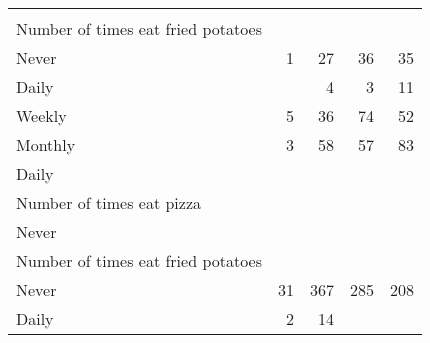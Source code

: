 \documentclass{article}
\begin{document}
\begin{tabular}{lllll}
  \multicolumn{1}{|r}{} &
  \multicolumn{1}{r}{} &
  \multicolumn{1}{r}{} &
  \multicolumn{1}{r}{} \\
\multicolumn{1}{l}{\hspace{4em}Number of times eat fried potatoes} &
  \multicolumn{1}{|r}{} &
  \multicolumn{1}{r}{} &
  \multicolumn{1}{r}{} &
  \multicolumn{1}{r}{} \\
\multicolumn{1}{l}{\hspace{5em}Never} &
  \multicolumn{1}{|r}{1} &
  \multicolumn{1}{r}{27} &
  \multicolumn{1}{r}{36} &
  \multicolumn{1}{r}{35} \\
\multicolumn{1}{l}{\hspace{5em}Daily} &
  \multicolumn{1}{|r}{} &
  \multicolumn{1}{r}{4} &
  \multicolumn{1}{r}{3} &
  \multicolumn{1}{r}{11} \\
\multicolumn{1}{l}{\hspace{5em}Weekly} &
  \multicolumn{1}{|r}{5} &
  \multicolumn{1}{r}{36} &
  \multicolumn{1}{r}{74} &
  \multicolumn{1}{r}{52} \\
\multicolumn{1}{l}{\hspace{5em}Monthly} &
  \multicolumn{1}{|r}{3} &
  \multicolumn{1}{r}{58} &
  \multicolumn{1}{r}{57} &
  \multicolumn{1}{r}{83} \\
\multicolumn{1}{l}{\hspace{1em}Daily} &
  \multicolumn{1}{|r}{} &
  \multicolumn{1}{r}{} &
  \multicolumn{1}{r}{} &
  \multicolumn{1}{r}{} \\
\multicolumn{1}{l}{\hspace{2em}Number of times eat pizza} &
  \multicolumn{1}{|r}{} &
  \multicolumn{1}{r}{} &
  \multicolumn{1}{r}{} &
  \multicolumn{1}{r}{} \\
\multicolumn{1}{l}{\hspace{3em}Never} &
  \multicolumn{1}{|r}{} &
  \multicolumn{1}{r}{} &
  \multicolumn{1}{r}{} &
  \multicolumn{1}{r}{} \\
\multicolumn{1}{l}{\hspace{4em}Number of times eat fried potatoes} &
  \multicolumn{1}{|r}{} &
  \multicolumn{1}{r}{} &
  \multicolumn{1}{r}{} &
  \multicolumn{1}{r}{} \\
\multicolumn{1}{l}{\hspace{5em}Never} &
  \multicolumn{1}{|r}{31} &
  \multicolumn{1}{r}{367} &
  \multicolumn{1}{r}{285} &
  \multicolumn{1}{r}{208} \\
\multicolumn{1}{l}{\hspace{5em}Daily} &
  \multicolumn{1}{|r}{2} &
  \multicolumn{1}{r}{14} &

\end{tabular}
\end{document}
